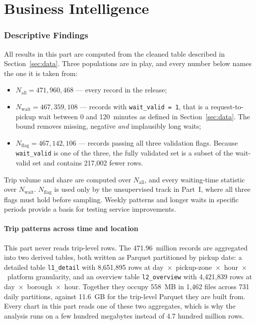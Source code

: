 \documentclass[11pt,a4paper]{article}
\newcommand{\code}[1]{\texttt{\small #1}}
\begin{document}
\part{Business Intelligence}

\section{Descriptive Findings}
\label{sec:bi}

All results in this part are computed from the cleaned table described in
Section~\ref{sec:data}. Three populations are in play, and every number below
names the one it is taken from:

\begin{itemize}
\item $N_{\text{all}} = 471{,}960{,}468$ --- every record in the release;
\item $N_{\text{wait}} = 467{,}359{,}108$ --- records with
      \code{wait\_valid = 1}, that is a request-to-pickup wait between 0 and
      120~minutes as defined in Section~\ref{sec:data}. The bound removes
      missing, negative \emph{and} implausibly long waits;
\item $N_{\text{flag}} = 467{,}142{,}106$ --- records
      passing all three validation flags. Because \code{wait\_valid} is one of
      the three, the fully validated set is a subset of the wait-valid set and
      contains 217{,}002 fewer rows.
\end{itemize}

Trip volume and share are computed over $N_{\text{all}}$, and every
waiting-time statistic over $N_{\text{wait}}$. $N_{\text{flag}}$ is used only by
the unsupervised track in Part~I, where all three flags must hold before
sampling. Weekly patterns and longer waits in specific periods provide a basis
for testing service improvements.

\subsection{Trip patterns across time and location}

This part never reads trip-level rows. The 471.96~million records are
aggregated into two derived tables, both written as Parquet partitioned by
pickup date: a detailed table \code{l1\_detail} with 8{,}651{,}895 rows at
day~$\times$~pickup-zone~$\times$~hour~$\times$~platform granularity, and an
overview table \code{l2\_overview} with 4{,}421{,}839 rows at
day~$\times$~borough~$\times$~hour. Together they occupy 558~MB in 1{,}462
files across 731 daily partitions, against 11.6~GB for the trip-level Parquet
they are built from. Every chart in this part reads one of these two
aggregates, which is why the analysis runs on a few hundred megabytes instead
of 4.7 hundred million rows.
\end{document}
